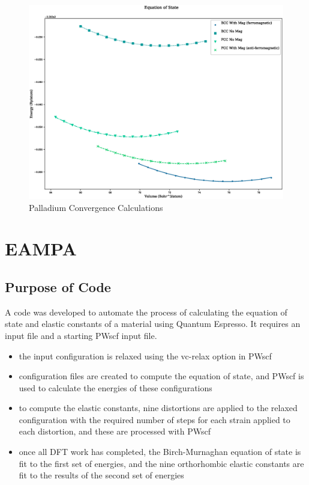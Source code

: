 \begin{figure}[h]
  \begin{center}
    \includegraphics[scale=0.55]{chapters/results_dft_reference_db/qeeos_plots/iron_eos_comparison.eps}
    \caption{Palladium Convergence Calculations}
    \label{graph:graph1}
  \end{center}
\end{figure}






\section{EAMPA}

\subsection{Purpose of Code}

A code was developed to automate the process of calculating the equation of state and elastic constants of a material using Quantum Espresso.  It requires an input file and a starting PWscf input file.  

\begin{itemize}
\item the input configuration is relaxed using the vc-relax option in PWscf
\item configuration files are created to compute the equation of state, and PWscf is used to calculate the energies of these configurations
\item to compute the elastic constants, nine distortions are applied to the relaxed configuration with the required number of steps for each strain applied to each distortion, and these are processed with PWscf
\item once all DFT work has completed, the Birch-Murnaghan equation of state is fit to the first set of energies, and the nine orthorhombic elastic constants are fit to the results of the second set of energies
\end{itemize}


